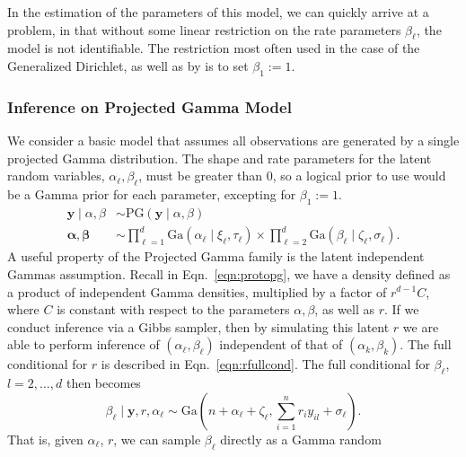 In the estimation of the parameters of this model, we can quickly arrive at a problem, in that
  without some linear restriction on the rate parameters $\beta_{\ell}$, the model is not identifiable.
  The restriction most often used in the case of the Generalized Dirichlet, as well as by
  \cite{nunez2019} is to set $\beta_1 := 1$.

\subsubsection{Inference on Projected Gamma Model}
We consider a basic model that assumes all observations are generated by a single projected Gamma
  distribution.  The shape and rate parameters for the latent  random variables,
  $\alpha_{\ell},\beta_{\ell}$, must be greater than 0, so a logical prior to use would be a Gamma prior for
  each parameter, excepting for $\beta_1 := 1$.
  \begin{equation}
    \label{eqn:vanillap}
    \begin{aligned}
      \bm{ y}\mid\alpha,\beta &\sim \text{PG}(\bm{ y}\mid\alpha,\beta)\\
      \bm{ \alpha},\bm{\beta} &\sim {\textstyle \prod}_{\ell = 1}^d \text{Ga}(\alpha_{\ell} \mid \xi_{\ell},\tau_{\ell})
              \times {\textstyle \prod}_{\ell = 2}^d \text{Ga}(\beta_{\ell}\mid \zeta_{\ell},\sigma_{\ell}).
    \end{aligned}
  \end{equation}
  A useful property of the Projected Gamma family is the latent independent Gammas assumption.  Recall
  in Eqn.~\ref{eqn:protopg}, we have a density defined as a product of independent Gamma densities,
  multiplied by a factor of $r^{d-1}C$, where $C$ is constant with respect to the parameters
  $\alpha,\beta$, as well as $r$.  If we conduct inference via a Gibbs sampler, then by simulating
  this latent $r$ we are able to perform inference of $(\alpha_{\ell},\beta_{\ell})$ independent of
  that of $(\alpha_k,\beta_k)$.  The full conditional for $r$ is described in Eqn.~\ref{eqn:rfullcond}.
  The full conditional for $\beta_{\ell}$, $l = 2,\ldots,d$ then becomes
  \begin{equation}
    \label{eqn:betafc}
    \beta_{\ell}\mid \bm{ y}, r, \alpha_{\ell} \sim \text{Ga}\left(n + \alpha_{\ell} + \zeta_{\ell},
                                      {\textstyle \sum}_{i = 1}^nr_iy_{il} + \sigma_{\ell}\right).
  \end{equation}
  That is, given $\alpha_{\ell}$, $r$, we can sample $\beta_{\ell}$ directly as a Gamma random
